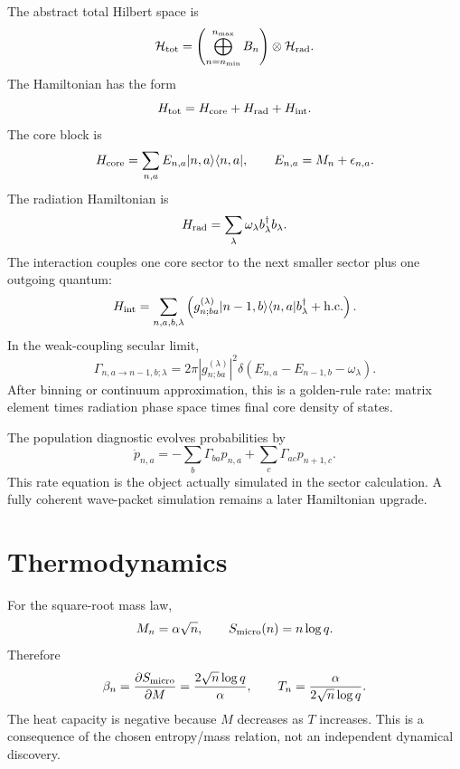 \documentclass[aps,prd,onecolumn,longbibliography,nofootinbib]{revtex4-2}
\newcommand{\Hrad}{\mathcal{H}_{\rm rad}}
\newcommand{\Htot}{\mathcal{H}_{\rm tot}}
\newcommand{\Smicro}{S_{\rm micro}}
\begin{document}
The abstract total Hilbert space is
\begin{equation}
    \Htot=
    \left(\bigoplus_{n=n_{\min}}^{n_{\max}} B_n\right)\otimes \Hrad .
\end{equation}
The Hamiltonian has the form
\begin{equation}
    H_{\rm tot}=H_{\rm core}+H_{\rm rad}+H_{\rm int}.
\end{equation}
The core block is
\begin{equation}
    H_{\rm core}=\sum_{n,a}E_{n,a}|n,a\rangle\langle n,a|,
    \qquad
    E_{n,a}=M_n+\epsilon_{n,a}.
\end{equation}
The radiation Hamiltonian is
\begin{equation}
    H_{\rm rad}=\sum_\lambda \omega_\lambda b_\lambda^\dagger b_\lambda .
\end{equation}
The interaction couples one core sector to the next smaller sector plus one
outgoing quantum:
\begin{equation}
    H_{\rm int}
    =
    \sum_{n,a,b,\lambda}
    \left(
    g^{(\lambda)}_{n;ba}|n-1,b\rangle\langle n,a|b_\lambda^\dagger
    +{\rm h.c.}
    \right).
\end{equation}
In the weak-coupling secular limit,
\begin{equation}
    \Gamma_{n,a\rightarrow n-1,b;\lambda}
    =
    2\pi |g^{(\lambda)}_{n;ba}|^2
    \delta(E_{n,a}-E_{n-1,b}-\omega_\lambda).
\end{equation}
After binning or continuum approximation, this is a golden-rule rate: matrix
element times radiation phase space times final core density of states.

The population diagnostic evolves probabilities by
\begin{equation}
    \dot p_{n,a}
    =
    -\sum_b \Gamma_{ba}p_{n,a}
    +\sum_c \Gamma_{ac}p_{n+1,c}.
\end{equation}
This rate equation is the object actually simulated in the sector
calculation.  A fully coherent wave-packet simulation remains a later
Hamiltonian upgrade.

\section{Thermodynamics}
\label{sec:thermo}

For the square-root mass law,
\begin{equation}
    M_n=\alpha\sqrt n,\qquad \Smicro(n)=n\log q .
\end{equation}
Therefore
\begin{equation}
    \beta_n=
    \frac{\partial \Smicro}{\partial M}
    =
    \frac{2\sqrt n\log q}{\alpha},
    \qquad
    T_n=\frac{\alpha}{2\sqrt n\log q}.
\end{equation}
The heat capacity is negative because $M$ decreases as $T$ increases.  This is
a consequence of the chosen entropy/mass relation, not an independent
dynamical discovery.
\end{document}
